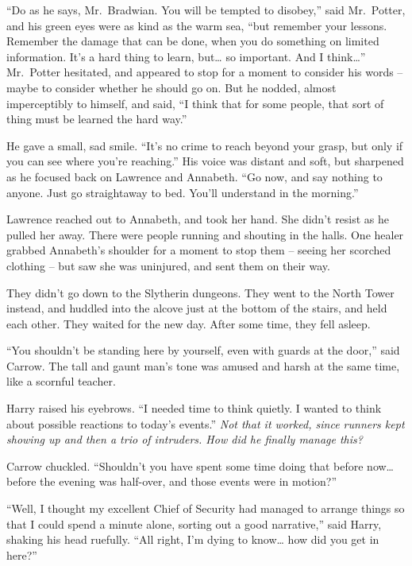 ``Do as he says, Mr.~Bradwian. You will be tempted to disobey,'' said
Mr.~Potter, and his green eyes were as kind as the warm sea, ``but
remember your lessons. Remember the damage that can be done, when you do
something on limited information. It's a hard thing to learn,
but\ldots{} so important. And I think\ldots{}'' Mr.~Potter hesitated,
and appeared to stop for a moment to consider his words -- maybe to
consider whether he should go on. But he nodded, almost imperceptibly to
himself, and said, ``I think that for some people, that sort of thing
must be learned the hard way.''

He gave a small, sad smile. ``It's no crime to reach beyond your grasp,
but only if you can see where you're reaching.'' His voice was distant
and soft, but sharpened as he focused back on Lawrence and Annabeth.
``Go now, and say nothing to anyone. Just go straightaway to bed. You'll
understand in the morning.''

Lawrence reached out to Annabeth, and took her hand. She didn't resist
as he pulled her away. There were people running and shouting in the
halls. One healer grabbed Annabeth's shoulder for a moment to stop them
-- seeing her scorched clothing -- but saw she was uninjured, and sent
them on their way.

They didn't go down to the Slytherin dungeons. They went to the North
Tower instead, and huddled into the alcove just at the bottom of the
stairs, and held each other. They waited for the new day. After some
time, they fell asleep.

\mybreak

``You shouldn't be standing here by yourself, even with guards at the
door,'' said Carrow. The tall and gaunt man's tone was amused and harsh
at the same time, like a scornful teacher.

Harry raised his eyebrows. ``I needed time to think quietly. I wanted to
think about possible reactions to today's events.'' \emph{Not that it
worked, since runners kept showing up and then a trio of intruders. How
did he finally manage this?}

Carrow chuckled. ``Shouldn't you have spent some time doing that before
now\ldots{} before the evening was half-over, and those events were in
motion?''

``Well, I thought my excellent Chief of Security had managed to arrange
things so that I could spend a minute alone, sorting out a good
narrative,'' said Harry, shaking his head ruefully. ``All right, I'm
dying to know\ldots{} how did you get in here?''

